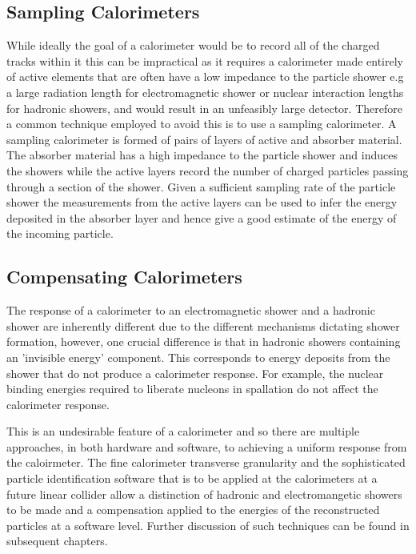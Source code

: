 \subsection{Sampling Calorimeters}
While ideally the goal of a calorimeter would be to record all of the charged tracks within it this can be impractical as it requires a calorimeter made entirely of active elements that are often have a low impedance to the particle shower e.g a large radiation length for electromagnetic shower or nuclear interaction lengths for hadronic showers, and would result in an unfeasibly large detector.  Therefore a common technique employed to avoid this is to use a sampling calorimeter.  A sampling calorimeter is formed of pairs of layers of active and absorber material.  The absorber material has a high impedance to the particle shower and induces the showers while the active layers record the number of charged particles passing through a section of the shower.  Given a sufficient sampling rate of the particle shower the measurements from the active layers can be used to infer the energy deposited in the absorber layer and hence give a good estimate of the energy of the incoming particle.  

\subsection{Compensating Calorimeters}
The response of a calorimeter to an electromagnetic shower and a hadronic shower are inherently different due to the different mechanisms dictating shower formation, however, one crucial difference is that in hadronic showers containing an 'invisible energy' component.  This corresponds to energy deposits from the shower that do not produce a calorimeter response.  For example, the nuclear binding energies required to liberate nucleons in spallation do not affect the calorimeter response.  

This is an undesirable feature of a calorimeter and so there are multiple approaches, in both hardware and software, to achieving a uniform response from the caloirmeter.  The fine calorimeter transverse granularity and the sophisticated particle identification software that is to be applied at the calorimeters at a future linear collider allow a distinction of hadronic and electromangetic showers to be made and a compensation applied to the energies of the reconstructed particles at a software level.  Further discussion of such techniques can be found in subsequent chapters. 

